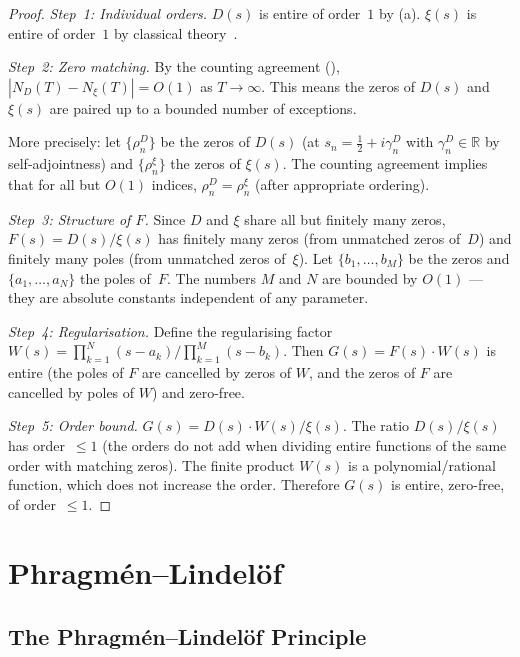 \documentclass[11pt,a4paper]{article}
\theoremstyle{plain}
\theoremstyle{remark}
\newcommand{\R}{\mathbb{R}}
\begin{document}
\begin{proof}
\emph{Step~1: Individual orders.}
$D(s)$ is entire of order~$1$ by (a).
$\xi(s)$ is entire of order~$1$ by classical
theory~\cite{titchmarsh1986}.

\emph{Step~2: Zero matching.}
By the counting agreement (),
$|N_D(T)-N_\xi(T)|=O(1)$ as $T\to\infty$.  This means the zeros
of $D(s)$ and $\xi(s)$ are paired up to a bounded number of exceptions.

More precisely: let $\{\rho_n^D\}$ be the zeros of $D(s)$ (at
$s_n=\tfrac{1}{2}+i\gamma_n^D$ with $\gamma_n^D\in\R$ by self-adjointness)
and $\{\rho_n^\xi\}$ the zeros of $\xi(s)$.  The counting agreement
implies that for all but $O(1)$ indices, $\rho_n^D=\rho_n^\xi$
(after appropriate ordering).

\emph{Step~3: Structure of $F$.}
Since $D$ and $\xi$ share all but finitely many zeros, $F(s)=D(s)/\xi(s)$
has finitely many zeros (from unmatched zeros of~$D$) and finitely many
poles (from unmatched zeros of~$\xi$).  Let
$\{b_1,\ldots,b_M\}$ be the zeros and $\{a_1,\ldots,a_N\}$ the poles
of~$F$.  The numbers $M$ and $N$ are bounded by $O(1)$ --- they are
absolute constants independent of any parameter.

\emph{Step~4: Regularisation.}
Define the regularising factor
$W(s)=\prod_{k=1}^N(s-a_k)\big/\prod_{k=1}^M(s-b_k)$.
Then $G(s)=F(s)\cdot W(s)$ is entire (the poles of $F$ are cancelled
by zeros of $W$, and the zeros of $F$ are cancelled by poles of $W$)
and zero-free.

\emph{Step~5: Order bound.}
$G(s)=D(s)\cdot W(s)/\xi(s)$.  The ratio $D(s)/\xi(s)$ has order~$\leq 1$
(the orders do not add when dividing entire functions of the same order
with matching zeros).  The finite product $W(s)$ is a polynomial/rational
function, which does not increase the order.  Therefore $G(s)$ is entire,
zero-free, of order~$\leq 1$.
\end{proof}

\section{Phragm\'en--Lindel\"of}\label{sec:phragmen-lindelof}

\subsection{The Phragm\'en--Lindel\"of Principle}
\end{document}
